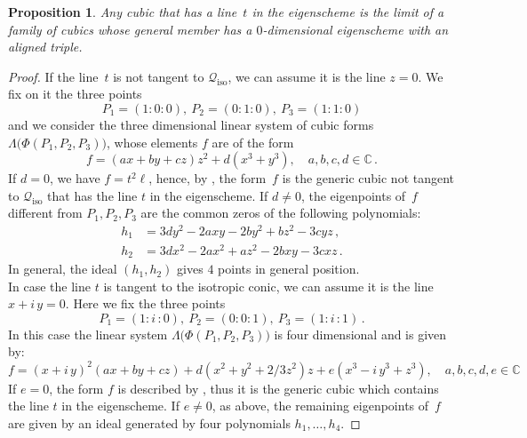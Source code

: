 \documentclass[a4paper, 11pt, reqno]{amsart}
\theoremstyle{plain}
\newtheorem{prop}[lemma]{Proposition}
\theoremstyle{definition}
\newcommand{\C}{\mathbb{C}}
\newcommand{\iii}{\textit{i}\,}
\newcommand{\iso}{\mathcal{Q}_{\mathrm{iso}}}
\begin{document}
%
\begin{prop}
\label{proposition:limitCubics}
Any cubic that has a line~$t$ in the eigenscheme is the limit of a family of cubics whose general member has a $0$-dimensional eigenscheme with an aligned triple.
\end{prop}
\begin{proof}
If the line~$t$ is not tangent to $\iso$, we can assume it is the line $z=0$. We fix on it the three points
%
\[
  P_1= (1: 0: 0), \ P_2 = (0: 1: 0), \ P_3 = (1: 1: 0)
\]
%
and we consider the three dimensional linear system of cubic forms $\Lambda \bigl( \Phi(P_1, P_2, P_3) \bigr)$, whose elements $f$ are of the form
%
\[
  f = (ax + by + cz)z^2 + d(x^3+y^3), \quad a, b, c, d \in \C \,.
\]
%
If $d=0$, we have $f=t^2 \ell$, hence, by , the form~$f$ is the 
generic cubic not tangent to $\iso$ that has the line $t$ in the eigenscheme.
If $d \neq 0$, the eigenpoints of~$f$ different from $P_1, P_2, P_3$ are
the common zeros of the following polynomials:
%
\begin{align*}
  h_1 & = 3dy^2 - 2axy - 2by^2 + bz^2 - 3cyz \,,\\
  h_2 & = 3dx^2 - 2ax^2 + az^2 - 2bxy - 3cxz \,.
\end{align*}
%
In general, the ideal $(h_1, h_2)$ gives $4$ points in 
general position. \\
In case the line $t$ is tangent to the isotropic conic, we can 
assume it is the line $x+\iii y =0$. Here we fix the three
points
\[
P_1 = (1: \iii: 0), \ P_2 = (0: 0: 1), \ P_3 = (1: \iii: 1) \,.
\]
In this case the linear system 
$\Lambda \bigl(\Phi(P_1, P_2, P_3)\bigr)$ is four dimensional and 
is given by:
\[
f = (x+\iii y)^2(ax + by+cz)+
 d(x^2 + y^2 + 2/3z^2)z+e (x^3 -\iii y^3 + z^3), 
 \quad a, b, c, d, e \in \C
\]
If $e=0$, the form $f$ is described by , thus it is the generic cubic which contains the line $t$ in the eigenscheme. If $e \not= 0$, as above, 
the remaining eigenpoints of~$f$ are given by an ideal generated 
by four polynomials $h_1, \dotsc, h_4$.

\end{proof}
\end{document}
